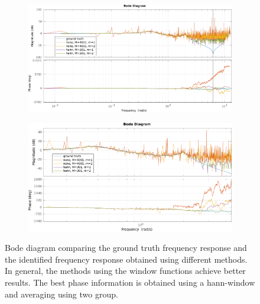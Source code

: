 \documentclass{scrartcl}
\newcommand*{\matlabcode}[3]{\begin{figure}[h!]\end{figure}}
\begin{document}
\begin{figure}[h]
	\centering
	\begin{subfigure}{\textwidth}
		\includegraphics[width=\textwidth]{figures/bode_1_6_large.pdf}
	\end{subfigure}
	\begin{subfigure}{\textwidth}
		\includegraphics[width=\textwidth]{figures/bode_1_6.pdf}
	\end{subfigure}
	\caption{Bode diagram comparing the ground truth frequency response and the identified frequency response obtained using different methods. In general, the methods using the window functions achieve better results. The best phase information is obtained using a hann-window and averaging using two group.}
	\label{fig:bode_final}
\end{figure}

\matlabcode{../matlab/ce1/spectral_analysis.m}
{{Compute the frequency response of the system to be identified using the spectral analysis method. The function interface provides additional parameters for specifiying the (optional) window and the corresponding window-width. If no window parameters are given, no window is used.}}
{lst:resp_spec_ana}
\end{document}
